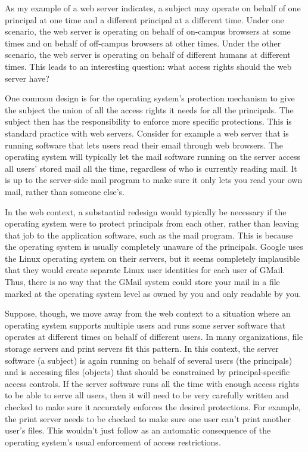 As my example of a web server indicates, a subject may operate on
behalf of one principal at one time and a different principal at a
different time.  Under one scenario, the web server is operating on
behalf of on-campus browsers at some times and on behalf of off-campus
browsers at other times.  Under the other scenario, the web server is
operating on behalf of different humans at different times.  This leads
to an interesting question: what access rights should the web server have?

One common design is for the operating system's protection mechanism
to give the subject the union of all the access rights it needs for
all the principals.  The subject then has the responsibility to
enforce more specific protections.  This is standard practice with web
servers.  Consider for example a web server that is running software
that lets users read their email through web browsers.  The operating
system will typically let the mail software running on the server
access all users' stored mail all the time, regardless of who is
currently reading mail.  It is up to the server-side mail program to
make sure it only lets you read your own mail, rather than someone
else's.

In the web context, a substantial redesign would typically be
necessary if the operating system were to protect principals from each
other, rather than leaving that job to the application software, such
as the mail program.  This is because the operating system is usually
completely unaware of the principals.  Google uses the Linux operating
system on their servers, but it seems completely implausible that they
would create separate Linux user identities for each user of GMail.
Thus, there is no way that the GMail system could store your mail in a
file marked at the operating system level as owned by you and only
readable by you.

Suppose, though, we move away from the web context to a situation
where an operating system supports multiple users and runs some server
software that operates at different times on behalf of different
users.  In many organizations, file storage servers and print servers
fit this pattern.  In this context, the server software (a subject) is
again running on behalf of several users (the principals) and is
accessing files (objects) that should be constrained by
principal-specific access controls.  If the server software runs all
the time with enough access rights to be able to serve all users, then
it will need to be very carefully written and checked to make sure it
accurately enforces the desired protections.  For example, the print
server needs to be checked to make sure one user can't print another
user's files.  This wouldn't just follow as an automatic consequence
of the operating system's usual enforcement of access restrictions.

